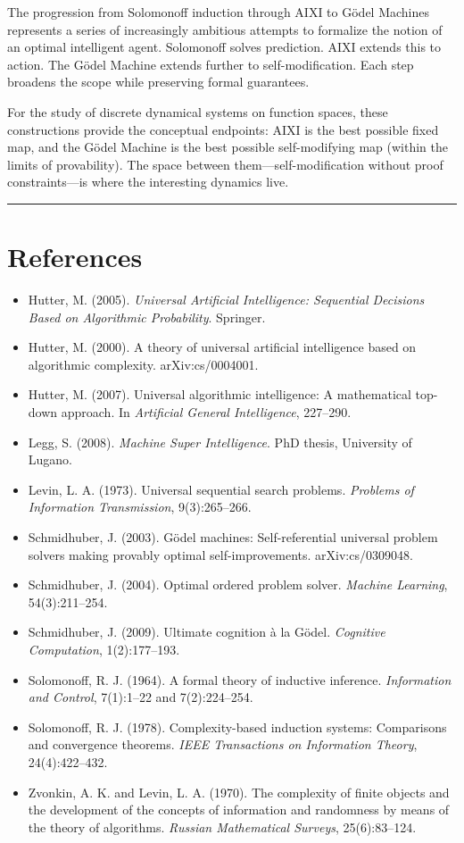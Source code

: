 The progression from Solomonoff induction through AIXI to Gödel Machines represents a series of increasingly ambitious attempts to formalize the notion of an optimal intelligent agent. Solomonoff solves prediction. AIXI extends this to action. The Gödel Machine extends further to self-modification. Each step broadens the scope while preserving formal guarantees.

For the study of discrete dynamical systems on function spaces, these constructions provide the conceptual endpoints: AIXI is the best possible fixed map, and the Gödel Machine is the best possible self-modifying map (within the limits of provability). The space between them---self-modification without proof constraints---is where the interesting dynamics live.

\bigskip\hrule\bigskip

\section{References}

\begin{itemize}
  \item Hutter, M. (2005). \textit{Universal Artificial Intelligence: Sequential Decisions Based on Algorithmic Probability}. Springer.
  \item Hutter, M. (2000). A theory of universal artificial intelligence based on algorithmic complexity. arXiv:cs/0004001.
  \item Hutter, M. (2007). Universal algorithmic intelligence: A mathematical top-down approach. In \textit{Artificial General Intelligence}, 227--290.
  \item Legg, S. (2008). \textit{Machine Super Intelligence}. PhD thesis, University of Lugano.
  \item Levin, L. A. (1973). Universal sequential search problems. \textit{Problems of Information Transmission}, 9(3):265--266.
  \item Schmidhuber, J. (2003). Gödel machines: Self-referential universal problem solvers making provably optimal self-improvements. arXiv:cs/0309048.
  \item Schmidhuber, J. (2004). Optimal ordered problem solver. \textit{Machine Learning}, 54(3):211--254.
  \item Schmidhuber, J. (2009). Ultimate cognition à la Gödel. \textit{Cognitive Computation}, 1(2):177--193.
  \item Solomonoff, R. J. (1964). A formal theory of inductive inference. \textit{Information and Control}, 7(1):1--22 and 7(2):224--254.
  \item Solomonoff, R. J. (1978). Complexity-based induction systems: Comparisons and convergence theorems. \textit{IEEE Transactions on Information Theory}, 24(4):422--432.
  \item Zvonkin, A. K. and Levin, L. A. (1970). The complexity of finite objects and the development of the concepts of information and randomness by means of the theory of algorithms. \textit{Russian Mathematical Surveys}, 25(6):83--124.
\end{itemize}
